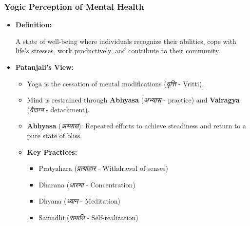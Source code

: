 \begin{frame}[fragile]\frametitle{Yogic Perception of Mental Health}

      \begin{itemize}
        \item \textbf{Definition:}
        
        A state of well-being where individuals recognize their abilities, cope with life's stresses, work productively, and contribute to their community.
        
        \item \textbf{Patanjali's View:}
        \begin{itemize}
            \item Yoga is the cessation of mental modifications (\textit{वृत्ति} - Vritti).
            \item Mind is restrained through \textbf{Abhyasa} (\textit{अभ्यास} - practice) and \textbf{Vairagya} (\textit{वैराग्य} - detachment).
            \item \textbf{Abhyasa} (\textit{अभ्यास}): Repeated efforts to achieve steadiness and return to a pure state of bliss.
            \item \textbf{Key Practices:} 
                \begin{itemize}
                    \item Pratyahara (\textit{प्रत्याहार} - Withdrawal of senses)
                    \item Dharana (\textit{धारणा} - Concentration)
                    \item Dhyana (\textit{ध्यान} - Meditation)
                    \item Samadhi (\textit{समाधि} - Self-realization)
                \end{itemize}
        \end{itemize}
      \end{itemize}

\end{frame}

